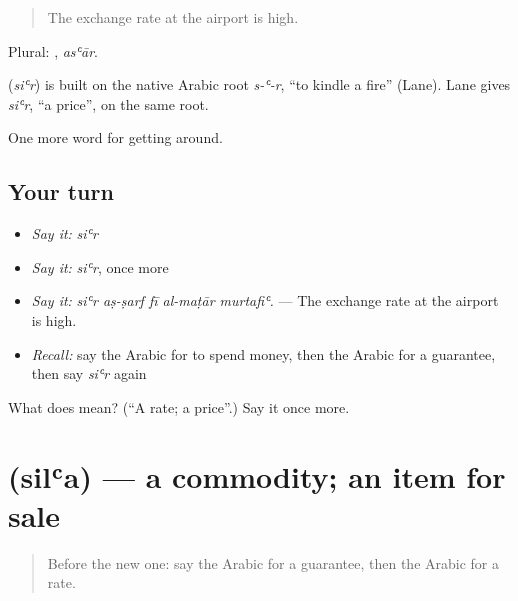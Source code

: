 \begin{quote}
The exchange rate at the airport is high.
\end{quote}

Plural: , \emph{asʿār}.

\begin{cousinweb}
\textbf{} (\emph{siʿr}) is built on the native Arabic root \emph{s-ʿ-r}, \textquotedblleft{}to kindle a fire\textquotedblright{} (Lane). Lane gives \emph{siʿr}, \textquotedblleft{}a price\textquotedblright{}, on the same root.
\end{cousinweb}

\begin{grammarlens}[title={What you've built}]
One more word for getting around.
\end{grammarlens}

\subsection*{Your turn}
\begin{itemize}
\raggedright
  \item \emph{Say it:} \emph{siʿr}
  \item \emph{Say it:} \emph{siʿr}, once more
  \item \emph{Say it:} \emph{siʿr aṣ-ṣarf fī al-maṭār murtafiʿ.} — The exchange rate at the airport is high.
  \item \emph{Recall:} say the Arabic for to spend money, then the Arabic for a guarantee, then say \emph{siʿr} again
\end{itemize}

\begin{tcolorbox}[breakable,colback=teal!4,colframe=teal!35!black,title={Before you move on}]
What does  mean? (\textquotedblleft{}A rate; a price\textquotedblright{}.) Say it once more.
\end{tcolorbox}
\section[\texorpdfstring{\ar{سلعة} (silʿa)}{سلعة (silʿa)}]{ (silʿa) — a commodity; an item for sale}

\label{lesson:AR-C458-silaa}



\begin{quote}
Before the new one: say the Arabic for a guarantee, then the Arabic for a rate.
\end{quote}

